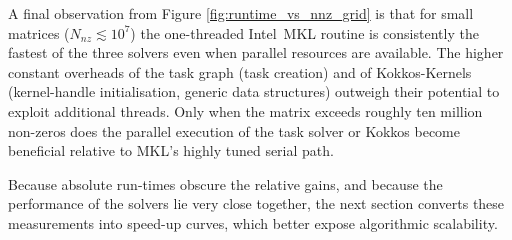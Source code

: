 A final observation from Figure \ref{fig:runtime_vs_nnz_grid} is that
for small matrices ($N_{nz} \lesssim 10^{7}$) the
one-threaded Intel~MKL routine is consistently the fastest of the
three solvers even when parallel resources are available.
The higher constant overheads of the task graph (task creation) and of Kokkos-Kernels (kernel-handle initialisation,
generic data structures) outweigh their potential to exploit additional
threads.  Only when the matrix exceeds roughly ten million non-zeros does the
parallel execution of the task solver or Kokkos become beneficial
relative to MKL’s highly tuned serial path.

Because absolute run-times obscure the relative gains, and because the performance of the solvers lie very close together,
the next section converts these measurements into
speed-up curves,
which better expose algorithmic scalability.

